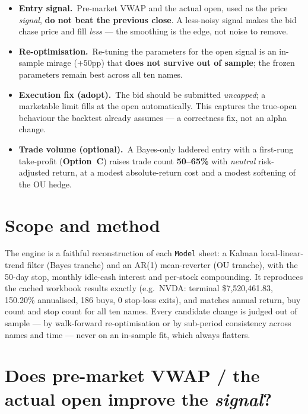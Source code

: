 \documentclass[11pt]{article}
\newcommand{\kpi}[2]{\textbf{#1}\,{\footnotesize\color{bcgrey}#2}}
\begin{document}
\begin{itemize}[leftmargin=1.4em,itemsep=2pt]
  \item \kpi{Entry signal.}{} Pre-market VWAP and the actual open, used as the price
        \emph{signal}, \textbf{do not beat the previous close}. A less-noisy signal makes the
        bid chase price and fill \emph{less} --- the smoothing is the edge, not noise to remove.
  \item \kpi{Re-optimisation.}{} Re-tuning the parameters for the open signal is an in-sample
        mirage ($+50$pp) that \textbf{does not survive out of sample}; the frozen parameters
        remain best across all ten names.
  \item \kpi{Execution fix (adopt).}{} The bid should be submitted \emph{uncapped}; a marketable
        limit fills at the open automatically. This captures the true-open behaviour the
        backtest already assumes --- a correctness fix, not an alpha change.
  \item \kpi{Trade volume (optional).}{} A Bayes-only laddered entry with a first-rung
        take-profit (\textbf{Option~C}) raises trade count \textbf{50--65\%} with
        \emph{neutral} risk-adjusted return, at a modest absolute-return cost and a modest
        softening of the OU hedge.
\end{itemize}

\section{Scope and method}

The engine is a faithful reconstruction of each \texttt{Model} sheet: a Kalman
local-linear-trend filter (Bayes tranche) and an AR(1) mean-reverter (OU tranche), with the
50-day stop, monthly idle-cash interest and per-stock compounding. It reproduces the cached
workbook results exactly (e.g.\ NVDA: terminal \$7{,}520{,}461.83, 150.20\% annualised,
186 buys, 0 stop-loss exits), and matches annual return, buy count and stop count for all ten
names. Every candidate change is judged out of sample --- by walk-forward re-optimisation or
by sub-period consistency across names and time --- never on an in-sample fit, which always
flatters.

\section{Does pre-market VWAP / the actual open improve the \emph{signal}?}
\end{document}
